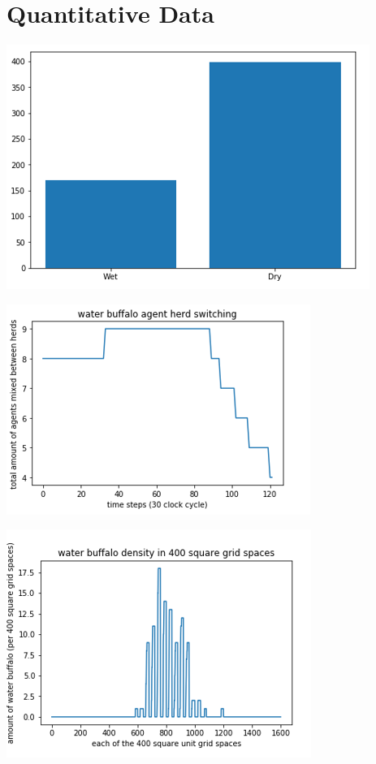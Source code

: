 \documentclass[12pt]{article}
\begin{document}
\section*{Quantitative Data}

\begin{center}
\includegraphics[scale=.5]{figure4.png}%
\label{labelname}%
\end{center}

\begin{center}
\includegraphics[scale=.6]{figure5.png}%
\label{labelname}%
\end{center}

\begin{center}
\includegraphics[scale=.6]{figure6.png}%
\label{labelname}%
\end{center}
\end{document}
